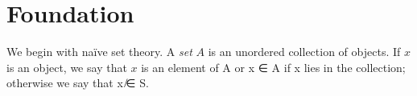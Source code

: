 
\chapter{Foundation}

We begin with na\"ive set theory. A \emph{set} $A$ is an unordered collection of objects. If $x$ is an object, we say that $x$ is an element of A or x ∈ A if x lies in the collection; otherwise we say that x ̸∈ S. 


